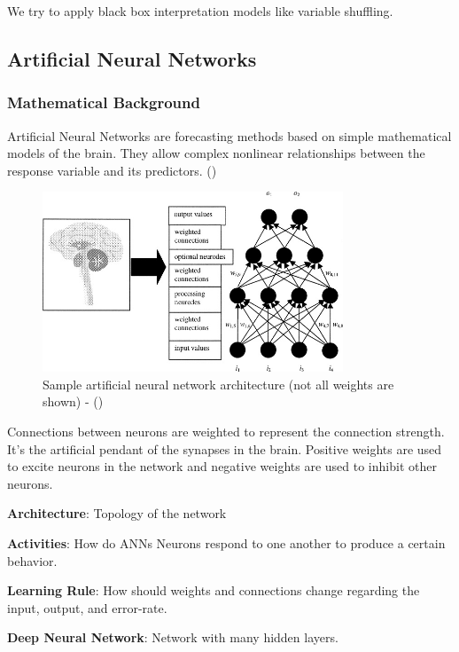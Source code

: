 \documentclass[]{article}
\begin{document}
We try to apply black box interpretation models like variable shuffling.

\subsection{Artificial Neural
Networks}\label{artificial-neural-networks}

\subsubsection{Mathematical Background}\label{mathematical-background-1}

Artificial Neural Networks are forecasting methods based on simple
mathematical models of the brain. They allow complex nonlinear
relationships between the response variable and its predictors.
(\cite{otexts})

\begin{figure}
    \centering
    \includegraphics[width=0.8\textwidth]{images/ann.jpg}
    \caption{Sample artificial neural network architecture (not all weights are shown) - (\cite{ann})}
    \label{fig:ann}
\end{figure}

Connections between neurons are weighted to represent the connection
strength. It's the artificial pendant of the synapses in the brain.
Positive weights are used to excite neurons in the network and negative
weights are used to inhibit other neurons.

\textbf{Architecture}: Topology of the network

\textbf{Activities}: How do ANNs Neurons respond to one another to
produce a certain behavior.

\textbf{Learning Rule}: How should weights and connections change
regarding the input, output, and error-rate.

\textbf{Deep Neural Network}: Network with many hidden layers.
\end{document}
